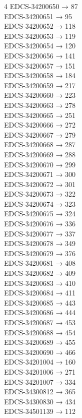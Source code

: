 \begin{multicols}{4}
EDCS-34200650 → 87\\
EDCS-34200651 → 95\\
EDCS-34200652 → 118\\
EDCS-34200653 → 119\\
EDCS-34200654 → 120\\
EDCS-34200656 → 141\\
EDCS-34200657 → 151\\
EDCS-34200658 → 184\\
EDCS-34200659 → 217\\
EDCS-34200660 → 223\\
EDCS-34200663 → 278\\
EDCS-34200665 → 251\\
EDCS-34200666 → 272\\
EDCS-34200667 → 279\\
EDCS-34200668 → 287\\
EDCS-34200669 → 288\\
EDCS-34200670 → 299\\
EDCS-34200671 → 300\\
EDCS-34200672 → 301\\
EDCS-34200673 → 322\\
EDCS-34200674 → 323\\
EDCS-34200675 → 324\\
EDCS-34200676 → 336\\
EDCS-34200677 → 337\\
EDCS-34200678 → 349\\
EDCS-34200679 → 376\\
EDCS-34200681 → 408\\
EDCS-34200682 → 409\\
EDCS-34200683 → 410\\
EDCS-34200684 → 411\\
EDCS-34200685 → 443\\
EDCS-34200686 → 444\\
EDCS-34200687 → 453\\
EDCS-34200688 → 454\\
EDCS-34200689 → 455\\
EDCS-34200690 → 466\\
EDCS-34201004 → 160\\
EDCS-34201006 → 271\\
EDCS-34201007 → 334\\
EDCS-34300812 → 365\\
EDCS-34300830 → 434\\
EDCS-34501139 → 112\\

\end{multicols}
